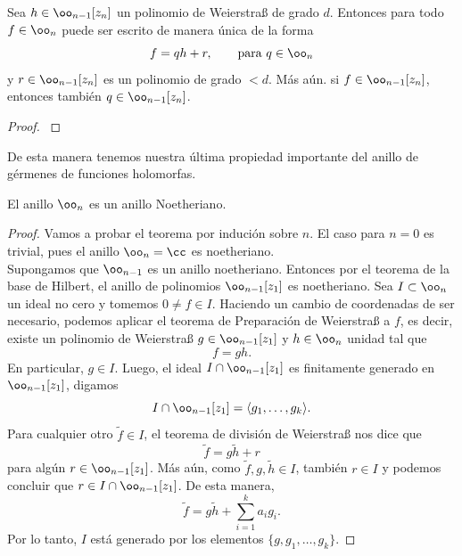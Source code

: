 \begin{theorem}
	Sea $h\in\oo_{n-1}[z_n]$ un polinomio de Weierstraß de grado $d$. Entonces para todo $f\in\oo_n$ puede ser escrito de manera única de la forma
	\begin{equation*}
		f=qh+r,\qquad\text{para }q\in \oo_n 
	\end{equation*} 
	y $r\in\oo_{n-1}[z_n]$ es un polinomio de grado $<d$. Más aún. si $f\in\oo_{n-1}[z_n]$, entonces también $q\in\oo_{n-1}[z_n]$.
\end{theorem}
\begin{proof}
	\parencite[Cap. 1, Sec, 1.1, Prop. 1.1.17]{huybrechts2005complex}
\end{proof}

De esta manera tenemos nuestra última propiedad importante del anillo de gérmenes de funciones holomorfas.

\begin{theorem}\label{anillonoetheriano}
	El anillo $\oo_{n}$ es un anillo Noetheriano.
\end{theorem}
\begin{proof}
	Vamos a probar el teorema por indución sobre $n$. El caso para $n=0$ es trivial, pues el anillo $\oo_n=\cc$ es noetheriano.\\
	Supongamos que $\oo_{n-1}$ es un anillo noetheriano. Entonces por el teorema de la base de Hilbert, el anillo de polinomios $\oo_{n-1}[z_1]$ es noetheriano. Sea $I\subset\oo_n$ un ideal no cero y tomemos $0\neq f\in I$. Haciendo un cambio de coordenadas de ser necesario, podemos aplicar el teorema de Preparación de Weierstraß a $f$, es decir, existe un polinomio de Weierstraß $g\in \oo_{n-1}[z_1]$ y $h\in\oo_n$ unidad tal que
	\begin{equation*}
		f=gh.
	\end{equation*}
	En particular, $g\in I$. Luego, el ideal $I\cap \oo_{n-1}[z_1]$ es finitamente generado en $\oo_{n-1}[z_1]$, digamos
	\begin{equation*}
		I\cap \oo_{n-1}[z_1]=\langle g_1,\dots,g_k \rangle.
	\end{equation*}
	Para cualquier otro $\tilde{f}\in I$, el teorema de división de Weierstraß nos dice que 
	\begin{equation*}
		\tilde{f}=g\tilde{h}+r
	\end{equation*}
	para algún $r\in\oo_{n-1}[z_1]$. Más aún, como $\tilde{f},g,\tilde{h}\in I$, también $r\in I$ y podemos concluir que $r\in I\cap \oo_{n-1}[z_1]$. De esta manera,
	\begin{equation*}
		\tilde{f}=g\tilde{h}+\sum_{i=1}^{k}a_ig_i.
	\end{equation*}
	Por lo tanto, $I$ está generado por los elementos $\{g,g_1,\dots,g_k\}$.
\end{proof}


